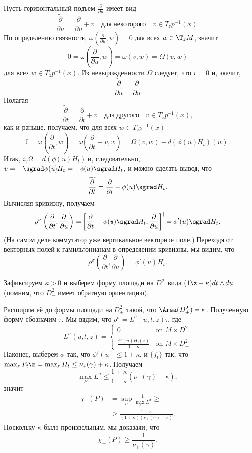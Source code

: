 Пусть горизонтальный подъем $\tfrac{\partial}{\partial u}$ имеет вид 
\[\widetilde{\frac{\partial}{\partial u}}  =\frac{\partial}{\partial u} + v
\quad\text{для некоторого}\quad
v \in T_z p^{-1} (x).\]
По определению связности, $\omega(\widetilde{\frac{\partial}{\partial u}},w)=0$ для всех $w\in \T_zM$, значит 
\[0=\omega\left(\widetilde{\frac{\partial}{\partial u}}, w\right) = \omega(v, w) = \Omega(v, w)\]
для всех $w \in T_z p^{-1} (x)$.
Из невырожденности $\Omega$ следует, что $v = 0$ и, значит, 
\[\widetilde{\frac{\partial}{\partial u}}=\frac{\partial}{\partial u}\]
Полагая
\[\widetilde{\frac{\partial}{\partial t}}=\frac{\partial}{\partial t}+v
\quad\text{для другого}\quad
v \in T_z p^{-1} (x),\]
как и раньше. получаем, что для всех $w \in T_z p^{-1} (x)$
\[0=\omega\left(\widetilde{\frac{\partial}{\partial t}}, w\right) = \omega(\frac{\partial}{\partial t}+v, w) = \Omega(v, w)- d(\phi(u)H_t)(w).
\]
Итак, 
$i_v \Omega = d(\phi(u)H_t)$ и, следовательно, 
$v = - \sgrad \phi(u)H_t = -\phi(u) \sgrad H_t$,
и можно сделать вывод, что 
\[\widetilde{\frac{\partial}{\partial t}}=\frac{\partial}{\partial t}-\phi(u) \sgrad H_t.\]
Вычисляя кривизну, получаем 
\[\rho^\sigma
\left(\frac{\partial}{\partial t},\frac{\partial}{\partial u}\right)
=
\left[\frac{\partial}{\partial t}-\phi(u)\sgrad H_t,\frac{\partial}{\partial u}\right]^\vert
=
\phi'(u)\sgrad H_t.\]
(На самом деле коммутатор уже вертикальное векторное поле.)
Переходя от векторных полей к гамильтонианам в определении кривизны, мы видим, что
\[\rho^\sigma\left(\frac{\partial}{\partial t},\frac{\partial}{\partial u}\right)
=\phi'(u) H_t.
\]

Зафиксируем $\kappa > 0$ и выберем форму площади на $D_-^2$ вида $(1 \z- \kappa)dt \wedge du$ (помним, что $D_-^2$ имеет обратную ориентацию).

Расширим её до формы площади на $D_+^2$ такой, что $\Area (D_+^2) = \kappa$.
Полученную форму обозначим $\tau$.
Мы видим, что $\rho^\sigma = L^\sigma (u, t, z)\tau$, где 
\[
L^\sigma(u,t,z)=
\begin{cases}
0&\text{on\ } M\times D^2_+
\\
\frac{\phi'(u)H_t(z)}{1-\kappa}&\text{on\ } M\times D^2_-
\end{cases}
\]
Наконец, выберем $\phi$ так, что $\phi' (u) \le 1 + \kappa$, и $\{f_t\}$ так, что $\max_z F_t \z= \max_z H_t \le \nu_+ (\gamma) + \kappa$.
Получаем
\[\max_P L^\sigma \le  \frac{1+\kappa}{1-\kappa} (\nu_+ (\gamma) + \kappa),\]
значит 
\begin{align*}
\chi_+ (P) &= \sup_\sigma \frac1{\max_PL^\sigma}\ge
\\
&\ge\frac{1-\kappa}{(1 + \kappa)(\nu_+ (\gamma) + \kappa)}. 
\end{align*}
Поскольку $\kappa$ было произвольным, мы доказали, что 
\[\chi_+ (P) \ge \frac{1}{\nu_+ (\gamma)}.\]
\qeds

